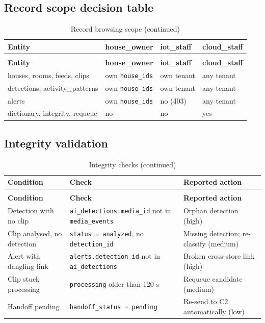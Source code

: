 \subsection{Record scope decision table}
\begin{longtable}{L{3.6cm}L{3.6cm}L{3.6cm}L{3.8cm}}
\caption{Record browsing scope}\label{tab:c3-scope-dt}\\
\toprule
\textbf{Entity} & \textbf{house\_owner} & \textbf{iot\_staff} & \textbf{cloud\_staff} \\
\midrule
\endfirsthead
\caption[]{Record browsing scope (continued)}\\
\toprule
\textbf{Entity} & \textbf{house\_owner} & \textbf{iot\_staff} & \textbf{cloud\_staff} \\
\midrule
\endhead
houses, rooms, feeds, clips & own \texttt{house\_ids} & own tenant & any tenant \\
detections, activity\_patterns & own \texttt{house\_ids} & own tenant & any tenant \\
alerts & own \texttt{house\_ids} & no (403) & any tenant \\
dictionary, integrity, requeue & no & no & yes \\
\bottomrule
\end{longtable}

\subsection{Integrity validation}
\begin{longtable}{L{4.2cm}L{5.2cm}L{5.2cm}}
\caption{Integrity checks}\\
\toprule
\textbf{Condition} & \textbf{Check} & \textbf{Reported action} \\
\midrule
\endfirsthead
\caption[]{Integrity checks (continued)}\\
\toprule
\textbf{Condition} & \textbf{Check} & \textbf{Reported action} \\
\midrule
\endhead
Detection with no clip & \texttt{ai\_detections.media\_id} not in \texttt{media\_events} & Orphan detection (high) \\
Clip analysed, no detection & \texttt{status = analyzed}, no \texttt{detection\_id} & Missing detection; re-classify (medium) \\
Alert with dangling link & \texttt{alerts.detection\_id} not in \texttt{ai\_detections} & Broken cross-store link (high) \\
Clip stuck processing & \texttt{processing} older than 120 s & Requeue candidate (medium) \\
Handoff pending & \texttt{handoff\_status = pending} & Re-send to C2 automatically (low) \\
\bottomrule
\end{longtable}

